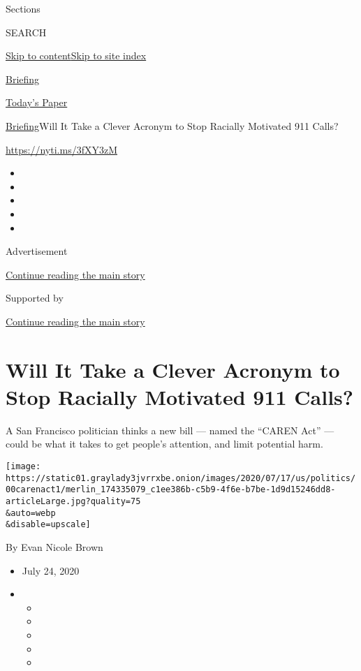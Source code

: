 Sections

SEARCH

\protect\hyperlink{site-content}{Skip to
content}\protect\hyperlink{site-index}{Skip to site index}

\href{https://www.nytimes3xbfgragh.onion/interactive/2018/briefing/global-morning-briefing-newsletter-signup.html}{Briefing}

\href{https://myaccount.nytimes3xbfgragh.onion/auth/login?response_type=cookie\&client_id=vi}{}

\href{https://www.nytimes3xbfgragh.onion/section/todayspaper}{Today's
Paper}

\href{/interactive/2018/briefing/global-morning-briefing-newsletter-signup.html}{Briefing}\textbar{}Will
It Take a Clever Acronym to Stop Racially Motivated 911 Calls?

\url{https://nyti.ms/3fXY3zM}

\begin{itemize}
\item
\item
\item
\item
\item
\end{itemize}

Advertisement

\protect\hyperlink{after-top}{Continue reading the main story}

Supported by

\protect\hyperlink{after-sponsor}{Continue reading the main story}

\hypertarget{will-it-take-a-clever-acronym-to-stop-racially-motivated-911-calls}{%
\section{Will It Take a Clever Acronym to Stop Racially Motivated 911
Calls?}\label{will-it-take-a-clever-acronym-to-stop-racially-motivated-911-calls}}

A San Francisco politician thinks a new bill --- named the ``CAREN Act''
--- could be what it takes to get people's attention, and limit
potential harm.

\texttt{[image: https://static01.graylady3jvrrxbe.onion/images/2020/07/17/us/politics/00carenact1/merlin\_174335079\_c1ee386b-c5b9-4f6e-b7be-1d9d15246dd8-articleLarge.jpg?quality=75\\\&auto=webp\\\&disable=upscale]}

By Evan Nicole Brown

\begin{itemize}
\item
  July 24, 2020
\item
  \begin{itemize}
  \item
  \item
  \item
  \item
  \item
  \end{itemize}
\end{itemize}

